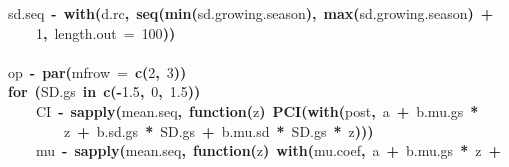 \documentclass{article}
\makeatletter
\newcommand{\hlnumber}[1]{\textcolor[rgb]{0,0,0}{#1}}%
\newcommand{\hlfunctioncall}[1]{\textcolor[rgb]{.5,0,.33}{\textbf{#1}}}%
\newcommand{\hlkeyword}[1]{\textbf{#1}}%
\newcommand{\hlargument}[1]{\textcolor[rgb]{.69,.25,.02}{#1}}%
\newcommand{\hlformalargs}[1]{\hlargument{#1}}%
\newcommand{\hlassignement}[1]{\textbf{#1}}%
\newcommand{\hlsymbol}[1]{#1}%
\newcommand{\hlstd}[1]{\textcolor[rgb]{0,0,0}{#1}}%
\newenvironment{kframe}{%
 \def\FrameCommand##1{\hskip\@totalleftmargin \hskip-\fboxsep
 \colorbox{shadecolor}{##1}\hskip-\fboxsep
     \hskip-\linewidth \hskip-\@totalleftmargin \hskip\columnwidth}%
 \MakeFramed {\advance\hsize-\width
   \@totalleftmargin\z@ \linewidth\hsize
   \@setminipage}}%
 {\par\unskip\endMakeFramed}
\newenvironment{knitrout}{}{} %
\makeatother
\begin{document}
\begin{knitrout}
{\begin{kframe}
\begin{flushleft}
\hlstd{}\hlsymbol{sd.seq}{\ }\hlassignement{\usebox{\hlnormalsizeboxlessthan}-}{\ }\hlfunctioncall{with}\hlkeyword{(}\hlsymbol{d.rc}\hlkeyword{,}{\ }\hlfunctioncall{seq}\hlkeyword{(}\hlfunctioncall{min}\hlkeyword{(}\hlsymbol{sd.growing.season}\hlkeyword{)}\hlkeyword{,}{\ }\hlfunctioncall{max}\hlkeyword{(}\hlsymbol{sd.growing.season}\hlkeyword{)}{\ }\hlkeyword{+}\hspace*{\fill}\\
\hlstd{}{\ }{\ }{\ }{\ }\hlnumber{1}\hlkeyword{,}{\ }\hlargument{length.out}{\ }\hlargument{=}{\ }\hlnumber{100}\hlkeyword{)}\hlkeyword{)}\hspace*{\fill}\\
\hlstd{}\hspace*{\fill}\\
\hlstd{}\hlsymbol{op}{\ }\hlassignement{\usebox{\hlnormalsizeboxlessthan}-}{\ }\hlfunctioncall{par}\hlkeyword{(}\hlargument{mfrow}{\ }\hlargument{=}{\ }\hlfunctioncall{c}\hlkeyword{(}\hlnumber{2}\hlkeyword{,}{\ }\hlnumber{3}\hlkeyword{)}\hlkeyword{)}\hspace*{\fill}\\
\hlstd{}\hlkeyword{for}{\ }\hlkeyword{(}\hlsymbol{SD.gs}{\ }\hlkeyword{in}{\ }\hlfunctioncall{c}\hlkeyword{(}\hlkeyword{-}\hlnumber{1.5}\hlkeyword{,}{\ }\hlnumber{0}\hlkeyword{,}{\ }\hlnumber{1.5}\hlkeyword{)}\hlkeyword{)}{\ }\hlkeyword{\usebox{\hlnormalsizeboxopenbrace}}\hspace*{\fill}\\
\hlstd{}{\ }{\ }{\ }{\ }\hlsymbol{CI}{\ }\hlassignement{\usebox{\hlnormalsizeboxlessthan}-}{\ }\hlfunctioncall{sapply}\hlkeyword{(}\hlsymbol{mean.seq}\hlkeyword{,}{\ }\hlkeyword{function}\hlkeyword{(}\hlformalargs{z}\hlkeyword{)}{\ }\hlfunctioncall{PCI}\hlkeyword{(}\hlfunctioncall{with}\hlkeyword{(}\hlsymbol{post}\hlkeyword{,}{\ }\hlsymbol{a}{\ }\hlkeyword{+}{\ }\hlsymbol{b.mu.gs}{\ }\hlkeyword{*}\hspace*{\fill}\\
\hlstd{}{\ }{\ }{\ }{\ }{\ }{\ }{\ }{\ }\hlsymbol{z}{\ }\hlkeyword{+}{\ }\hlsymbol{b.sd.gs}{\ }\hlkeyword{*}{\ }\hlsymbol{SD.gs}{\ }\hlkeyword{+}{\ }\hlsymbol{b.mu.sd}{\ }\hlkeyword{*}{\ }\hlsymbol{SD.gs}{\ }\hlkeyword{*}{\ }\hlsymbol{z}\hlkeyword{)}\hlkeyword{)}\hlkeyword{)}\hspace*{\fill}\\
\hlstd{}{\ }{\ }{\ }{\ }\hlsymbol{mu}{\ }\hlassignement{\usebox{\hlnormalsizeboxlessthan}-}{\ }\hlfunctioncall{sapply}\hlkeyword{(}\hlsymbol{mean.seq}\hlkeyword{,}{\ }\hlkeyword{function}\hlkeyword{(}\hlformalargs{z}\hlkeyword{)}{\ }\hlfunctioncall{with}\hlkeyword{(}\hlsymbol{mu.coef}\hlkeyword{,}{\ }\hlsymbol{a}{\ }\hlkeyword{+}{\ }\hlsymbol{b.mu.gs}{\ }\hlkeyword{*}{\ }\hlsymbol{z}{\ }\hlkeyword{+}\hspace*{\fill}\\

\end{flushleft}
\end{kframe}}
\end{knitrout}
\end{document}
